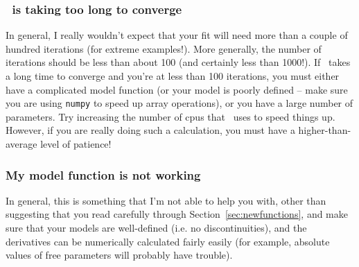 \subsubsection{\alis\ is taking too long to converge}

In general, I really wouldn't expect that your fit will need
more than a couple of hundred iterations (for extreme
examples!). More generally, the number of iterations
should be less than about 100 (and certainly less than
1000!). If \alis\ takes a long time to converge and you're
at less than 100 iterations, you must
either have a complicated model function
(or your model is poorly defined -- make sure you
are using \texttt{numpy} to speed up array operations),
or you have a large number of parameters. Try increasing
the number of cpus that \alis\ uses to speed things up.
However, if you are really doing such a calculation, you
must have a higher-than-average level of patience!

\subsubsection{My model function is not working}

In general, this is something that I'm not able to help you with,
other than suggesting that you read carefully through
Section~\ref{sec:newfunctions}, and make sure that your models
are well-defined (i.e. no discontinuities), and the derivatives can
be numerically calculated fairly easily (for example, absolute
values of free parameters will probably have trouble).

